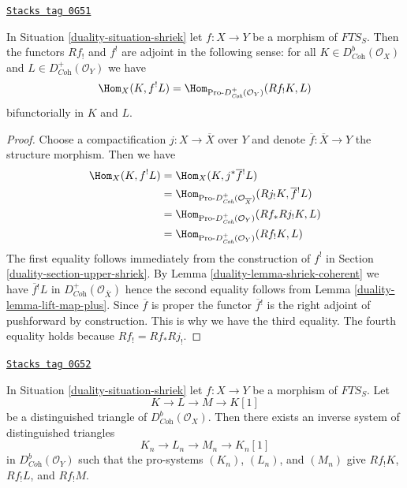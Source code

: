 \begin{proposition}
\label{duality-proposition-duality-compactly-supported}
\href{https://stacks.math.columbia.edu/tag/0G51}{\texttt{Stacks tag 0G51}}

In Situation \ref{duality-situation-shriek} let $f : X \to Y$ be a morphism of
$\textit{FTS}_S$. Then the functors $Rf_!$ and $f^!$ are adjoint in
the following sense: for all $K \in D^b_{\textit{Coh}}(\mathcal{O}_X)$
and $L \in D^+_{\textit{Coh}}(\mathcal{O}_Y)$ we have
$$
\Hom_X(K, f^!L) =
\Hom_{\text{Pro-}D^+_{\textit{Coh}}(\mathcal{O}_Y)}(Rf_!K, L)
$$
bifunctorially in $K$ and $L$.
\end{proposition}

\begin{proof}

Choose a compactification $j : X \to \overline{X}$ over $Y$ and
denote $\overline{f} : \overline{X} \to Y$ the structure morphism.
Then we have
\begin{align*}
\Hom_X(K, f^!L)
& =
\Hom_X(K, j^*\overline{f}{}^!L) \\
& =
\Hom_{\text{Pro-}D^+_{\textit{Coh}}(\mathcal{O}_{\overline{X}})}
(Rj_!K, \overline{f}{}^!L) \\
& =
\Hom_{\text{Pro-}D^+_{\textit{Coh}}(\mathcal{O}_Y)}(Rf_*Rj_!K, L) \\
& =
\Hom_{\text{Pro-}D^+_{\textit{Coh}}(\mathcal{O}_Y)}(Rf_!K, L)
\end{align*}
The first equality follows immediately from the construction of $f^!$ in
Section \ref{duality-section-upper-shriek}.
By Lemma \ref{duality-lemma-shriek-coherent} we have $\overline{f}{}^!L$
in $D^+_{\textit{Coh}}(\mathcal{O}_{\overline{X}})$ hence the second
equality follows from Lemma \ref{duality-lemma-lift-map-plus}.
Since $\overline{f}$ is proper the functor $\overline{f}{}^!$
is the right adjoint of pushforward by construction. This is
why we have the third equality.
The fourth equality holds because $Rf_! = Rf_* Rj_!$.
\end{proof}

\begin{lemma}
\label{duality-lemma-compactly-supported-triangle}
\href{https://stacks.math.columbia.edu/tag/0G52}{\texttt{Stacks tag 0G52}}

In Situation \ref{duality-situation-shriek} let $f : X \to Y$ be a morphism of
$\textit{FTS}_S$. Let
$$
K \to L \to M \to K[1]
$$
be a distinguished triangle of $D^b_{\textit{Coh}}(\mathcal{O}_X)$.
Then there exists an inverse system of distinguished triangles
$$
K_n \to L_n \to M_n \to K_n[1]
$$
in $D^b_{\textit{Coh}}(\mathcal{O}_Y)$ such that the pro-systems
$(K_n)$, $(L_n)$, and $(M_n)$ give $Rf_!K$, $Rf_!L$, and $Rf_!M$.
\end{lemma}

